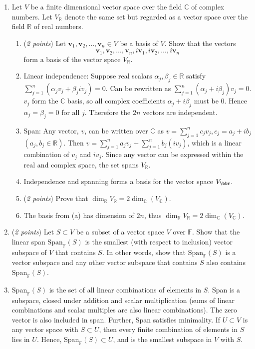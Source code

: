 \documentclass[11pt]{article}
\newcommand{\bbC}{\mathbb{C}}
\newcommand{\bbF}{\mathbb{F}}
\newcommand{\bbR}{\mathbb{R}}
\theoremstyle{definition}
\numberwithin{equation}{subsection}
\begin{document}
\begin{enumerate}
\item Let $V$ be a finite dimensional vector space over the field $\bbC$ of complex numbers. Let $V_{\mathbb{R}}$ denote the same set but regarded as a vector space over the field $\bbR$ of real numbers.

\begin{enumerate}
\item (\emph{2 points}) Let $\mathbf{v}_1,\mathbf{v}_2,\ldots, \mathbf{v}_n \in V$ be a basis of $V$. Show that the vectors
$$\mathbf{v}_1, \mathbf{v}_2,\ldots, \mathbf{v}_n, i\mathbf{v}_1,i\mathbf{v}_2, \ldots, i\mathbf{v}_n$$
form a basis of the vector space $V_{\mathbb{R}}$.
\item[] Linear independence: Suppose real scalars $\alpha _j, \beta _j \in \bbR$ satisfy $\sum^n_{j=1}(\alpha _jv_j+\beta _jiv_j)=0$. Can be rewritten as $\sum ^n_{j=1} (\alpha _j+i\beta _j)v_j=0$. $v_j$ form the $\bbC$ basis, so all complex coefficients $\alpha _j+i\beta _j$ must be 0. Hence $\alpha _j=\beta _j=0$ for all $j$. Therefore the $2n$ vectors are independent.
\item[] Span: Any vector, $v$, can be written over $\bbC$ as $v=\sum ^n_{j=1} c_jv_j, c_j=a_j+ib_j$ $(a_j,b_j\in \bbR)$. Then $v=\sum ^n_{j=1} a_jv_j+\sum ^n_{j=1}b_j(iv_j)$, which is a linear combination of $v_j$ and $iv_j$. Since any vector can be expressed within the real and complex space, the set spans $V_\bbR$.
\item[] Independence and spanning forms a basis for the vector space $V_\bbr$.

\item (\emph{2 points}) Prove that $\dim_{\bbR} V_{\bbR} = 2\dim_{\bbC}(V_\bbC)$.
\item[] The basis from (a) has dimension of $2n$, thus $\dim_{\bbR} V_{\bbR} = 2\dim_{\bbC}(V_\bbC)$.
\end{enumerate}

\item (\emph{2 points}) Let $S\subset V$ be a subset of a vector space $V$ over $\bbF$. Show that the linear span $\mathrm{Span}_{\bbF}(S)$ is the smallest (with respect to inclusion) vector subspace of $V$ that contains $S$. In other words, show that $\mathrm{Span}_{\bbF}(S)$ is a vector subspace and any other vector subspace that contains $S$ also contains $\mathrm{Span}_{\bbF}(S)$.
\item[] $\mathrm{Span}_{\bbF}(S)$ is the set of all linear combinations of elements in $S$. Span is a subspace, closed under addition and scalar multiplication (sums of linear combinations and scalar multiples are also linear combinations). The zero vector is also included in span. Further, Span satisfies minimality. If $U\subset V$ is any vector space with $S\subset U$, then every finite combination of elements in $S$ lies in $U$. Hence, $\mathrm{Span}_{\bbF}(S) \subset U$, and is the smallest subspace in $V$ with $S$.


\end{enumerate}
\end{document}
